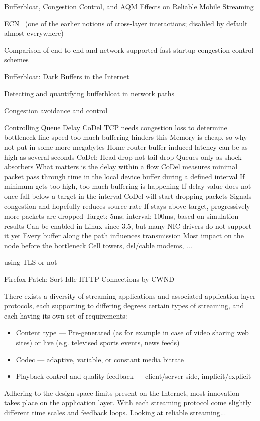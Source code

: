 Bufferbloat, Congestion Control, and AQM Effects on Reliable Mobile Streaming

 ECN~\cite{rfc3168} (one of the earlier notions of cross-layer interactions; disabled by default almost everywhere)

Comparison of end-to-end and network-supported fast startup congestion control schemes \cite{scharf2011comparison}

Bufferbloat: Dark Buffers in the Internet \cite{gettys2011bufferbloat}

Detecting and quantifying bufferbloat in network paths \cite{groenewegen2011detecting}

Congestion avoidance and control \cite{jacobson1988congestion}

Controlling Queue Delay \cite{Nichols:2012:CQD:2209249.2209264} CoDel\cite{nichols2014codel}
 TCP needs congestion loss to determine bottleneck line speed
	too much buffering hinders this
 Memory is cheap, so why not put in some more megabytes
 Home router buffer induced latency can be as high as several seconds
CoDel:
 Head drop not tail drop
 Queues only as shock absorbers
 What matters is the delay within a flow
 CoDel measures minimal packet pass through time in the local device buffer during a defined interval
 If minimum gets too high, too much buffering is happening
 If delay value does not once fall below a target in the interval CoDel will start dropping packets
	Signals congestion and hopefully reduces source rate
	If stays above target, progressively more packets are dropped
	Target: 5ms; interval: 100ms, based on simulation results
 Can be enabled in Linux since 3.5, but many NIC drivers do not support it yet
 Every buffer along the path influences transmission
	Most impact on the node before the bottleneck
	Cell towers, dsl/cable modems, ...


using TLS or not

Firefox Patch: Sort Idle HTTP Connections by CWND \cite{ffSortCWND}

There exists a diversity of streaming applications and associated application-layer protocols, each supporting to differing degrees certain types of streaming, and each having its own set of requirements:
\begin{itemize}
\item Content type --- Pre-generated (as for example in case of video sharing web sites) or live (e.g. televised sports events, news feeds)
\item Codec --- adaptive, variable, or constant media bitrate
\item Playback control and quality feedback --- client/server-side, implicit/explicit
\end{itemize}
Adhering to the design space limits present on the Internet, most innovation takes place on the application layer.
With each streaming protocol come slightly different time scales and feedback loops. Looking at reliable streaming...


